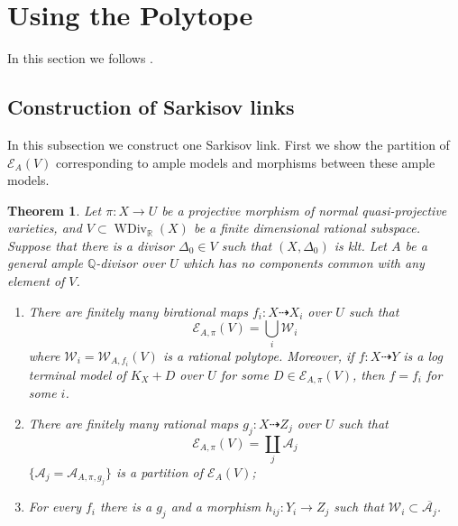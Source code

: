 \documentclass[11pt]{amsart}
\numberwithin{equation}{section}
\newtheorem{thm}[defn]{Theorem}
\begin{document}
\section{Using the Polytope}\label{thirdmethod}
In this section we follows \cite{haconSarkisovProgram2012}.
\subsection{Construction of Sarkisov links}
In this subsection we construct one Sarkisov link. First we show the partition of $\mathcal{E}_{A}(V)$  corresponding to ample models and morphisms between these ample models.
\begin{thm}\label{finitemodel}
\cite[Corollary 1.1.5]{birkarExistenceMinimalModels2009}Let $\pi:X\to U$ be a projective morphism of normal quasi-projective varieties,  and $V \subset \operatorname{WDiv}_{\mathbb{R}}(X)$ be a finite dimensional rational subspace. Suppose that there is a divisor $\Delta_{0} \in V$ such that $(X,\Delta_{0})$ is klt. Let $A$ be a general ample $\mathbb{Q}$-divisor over $U$ which has no components common with any element of $V$.  
  \begin{enumerate}
    \item   There are finitely many birational maps $f_{i}:X \dashrightarrow   X_{i}$ over $U$ such that 
      \[
        \mathcal{E}_{A,\pi}(V) =\bigcup_{i}\mathcal{W}_{i}
      \]
      where  $\mathcal{W}_{i}=\mathcal{W}_{A,f_{i}}(V)$ is a rational polytope. Moreover, if  $f:X \dashrightarrow  Y$ is a  log terminal model of $K_{X}+D$ over $U$ for some $D \in \mathcal{E}_{A,\pi}(V)$, then  $f=f_{i}$ for some $i$.  

    \item   There are finitely many rational maps $g_{j}:X \dashrightarrow  Z_{j}$ over $U$ such that
      \[
        \mathcal{E}_{A,\pi}(V) =\coprod_{j}\mathcal{A}_{j}
      \]
      $ \{\mathcal{A}_j=\mathcal{A}_{A,\pi,g_j}\} $ is a partition of $ \mathcal{E}_{A}(V) $;
    \item  For every  $f_{i}$ there is a $g_{j}$ and a morphism $h_{ij}:Y_{i}\to Z_{j}$ such that $\mathcal{W}_{i} \subset \overline{\mathcal{A}_{j}}$.   
  \end{enumerate}
\end{thm}
\end{document}
